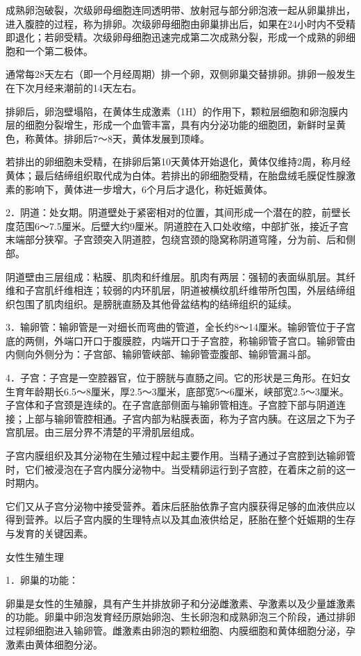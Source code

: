 \documentclass[12pt,UTF8]{ctexbook}
\begin{document}
成熟卵泡破裂，次级卵母细胞连同透明带、放射冠与部分卵泡液一起从卵巢排出，进入腹腔的过程，称为排卵。次级卵母细胞由卵巢排出后，如果在24小时内不受精即退化；若卵受精。次级卵母细胞迅速完成第二次成熟分裂，形成一个成熟的卵细胞和一个第二极体。

通常每28天左右（即一个月经周期）排一个卵，双侧卵巢交替排卵。排卵一般发生在下次月经来潮前的14天左右。

排卵后，卵泡壁塌陷，在黄体生成激素（1H）的作用下，颗粒层细胞和卵泡膜内层的细胞分裂增生，形成一个血管丰富，具有内分泌功能的细胞团，新鲜时呈黄色，称黄体。排卵后7～8天，黄体发展到顶峰。

若排出的卵细胞未受精，在排卵后第10天黄体开始退化，黄体仅维持2周，称月经黄体；最后结缔组织取代成为白体。若排出的卵细胞受精，在胎盘绒毛膜促性腺激素的影响下，黄体进一步增大，6个月后才退化，称妊娠黄体。

2．阴道：处女期。阴道壁处于紧密相对的位置，其间形成一个潜在的腔，前壁长度范围6～7.5厘米。后壁大约9厘米。阴道腔在入口处收缩，中部扩张，接近子宫末端部分狭窄。子宫颈突入阴道腔，包绕宫颈的隐窝称阴道穹隆，分为前、后和侧部。

阴道壁由三层组成：粘膜、肌肉和纤维层。肌肉有两层：强韧的表面纵肌层。其纤维和子宫肌纤维相连；较弱的内环肌层，阴道被横纹肌纤维带所包围，外层结缔组织包围了肌肉组织。是膀胱直肠及其他骨盆结构的结缔组织的延续。

3．输卵管：输卵管是一对细长而弯曲的管道，全长约8～14厘米。输卵管位于子宫底的两侧，外端口开口于腹膜腔，内端开口于子宫腔，称输卵管子宫口。输卵管由内侧向外侧分为：子宫部、输卵管峡部、输卵管壶腹部、输卵管漏斗部。

4．子宫：子宫是一空腔器官，位于膀胱与直肠之间。它的形状是三角形。在妇女生育年龄期长6.5～8厘米，厚2.5～3厘米，底部宽5～6厘米，峡部宽2.5～3厘米。子宫体和子宫颈是连续的。在子宫底部侧面与输卵管相连。子宫腔下部与阴道连接；上部与输卵管腔相通。子宫内部为粘膜表面，称为子宫内胰。在这层之下为子宫肌层。由三层分界不清楚的平滑肌层组成。

子宫内膜组织及其分泌物在生殖过程中起主要作用。当精子通过子宫腔到达输卵管时，它们被浸泡在子宫内膜分泌物中。当受精卵运行到子宫腔，在着床之前的这一时期内。

它们又从子宫分泌物中接受营养。着床后胚胎依靠子宫内膜获得足够的血液供应以得到营养。以后子宫内膜的生理特点以及其血液供给足，胚胎在整个妊娠期的生存与发育的关键因素。

女性生殖生理

1．卵巢的功能：

卵巢是女性的生殖腺，具有产生并排放卵子和分泌雌激素、孕激素以及少量雄激素的功能。卵巢中卵泡发育经历原始卵泡、生长卵泡和成熟卵泡三个阶段，通过排卵过程卵细胞进入输卵管。雌激素由卵泡的颗粒细胞、内膜细胞和黄体细胞分泌，孕激素由黄体细胞分泌。
\end{document}
